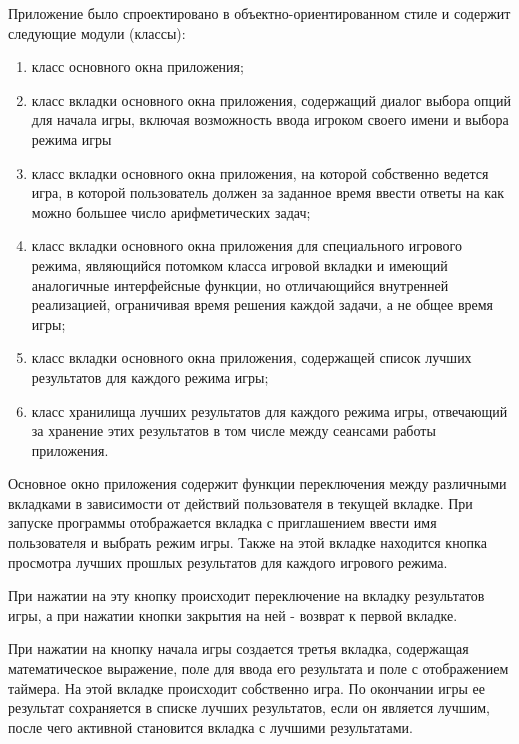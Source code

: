 \documentclass[a4paper,12pt]{article}
\begin{document}
Приложение было спроектировано в объектно-ориентированном стиле и содержит следующие модули (классы):

\begin{enumerate}
\item класс основного окна приложения;
\item класс вкладки основного окна приложения, содержащий диалог выбора опций для начала игры, включая возможность ввода игроком своего имени и выбора режима игры
\item класс вкладки основного окна приложения, на которой собственно ведется игра, в которой пользователь должен за заданное время ввести ответы на как можно большее число арифметических задач;
\item класс вкладки основного окна приложения для специального игрового режима, являющийся потомком класса игровой вкладки и имеющий аналогичные интерфейсные функции, но отличающийся внутренней реализацией, ограничивая время решения каждой задачи, а не общее время игры;
\item класс вкладки основного окна приложения, содержащей список лучших результатов для каждого режима игры;
\item класс хранилища лучших результатов для каждого режима игры, отвечающий за хранение этих результатов в том числе между сеансами работы приложения.
\end{enumerate}

Основное окно приложения содержит функции переключения между различными вкладками в
зависимости от действий пользователя в текущей вкладке. При запуске программы отображается
вкладка с приглашением ввести имя пользователя и выбрать режим игры. Также на этой вкладке
находится кнопка просмотра лучших прошлых результатов для каждого игрового режима.

При нажатии на эту кнопку происходит переключение на вкладку результатов игры,
а при нажатии кнопки закрытия на ней - возврат к первой вкладке.

При нажатии на кнопку начала игры создается третья вкладка, содержащая математическое
выражение, поле для ввода его результата и поле с отображением таймера. На этой вкладке
происходит собственно игра. По окончании игры ее результат сохраняется в списке
лучших результатов, если он является лучшим, после чего активной становится вкладка
с лучшими результатами.


\newpage
\end{document}
